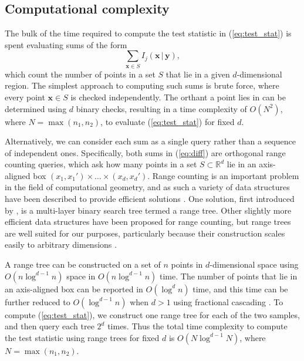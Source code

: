 
\subsection{Computational complexity}
The bulk of the time required to compute the test statistic in (\ref{eq:test_stat}) is spent evaluating sums of the form
\begin{equation*}
\sum_{\mathbf{x}\in S}I_{j}\left(\mathbf{x}\,\rvert\,\mathbf{y}\right),
\end{equation*}
which count the number of points in a set $S$ that lie in a given $d$-dimensional region. The simplest approach to computing such sums is brute force, where every point $\mathbf{x}\in S$ is checked independently. The orthant a point lies in can be determined using $d$ binary checks, resulting in a time complexity of $O(N^{2})$, where $N=\max(n_{1},n_{2})$, to evaluate (\ref{eq:test_stat}) for fixed $d$.

Alternatively, we can consider each sum as a single query rather than a sequence of independent ones. Specifically, both sums in (\ref{eq:diff}) are orthogonal range counting queries, which ask how many points in a set $S\subset\mathbb{R}^{d}$ lie in an axis-aligned box $(x_{1},x_{1}')\times\dots \times(x_{d},x_{d}')$. Range counting is an important problem in the field of computational geometry, and as such a variety of data structures have been described to provide efficient solutions \citep{geometry_2008}. One solution, first introduced by \citet{bentley_decomposable_1979}, is a multi-layer binary search tree termed a range tree. Other slightly more efficient data structures have been proposed for range counting, but range trees are well suited for our purposes, particularly because their construction scales easily to arbitrary dimensions \citep{bentley_decomposable_1979, geometry_2008}.

A range tree can be constructed on a set of $n$ points in $d$-dimensional space using $O(n\log^{d-1}n)$ space in $O(n\log^{d-1}n)$ time. The number of points that lie in an axis-aligned box can be reported in $O(\log^{d}n)$ time, and this time can be further reduced to $O(\log^{d-1}n)$ when $d>1$ using fractional cascading \citep{geometry_2008}. To compute (\ref{eq:test_stat}), we construct one range tree for each of the two samples, and then query each tree $2^{d}$ times. Thus the total time complexity to compute the test statistic using range trees for fixed $d$ is $O(N\log^{d-1}N)$, where $N=\max(n_{1},n_{2})$.

